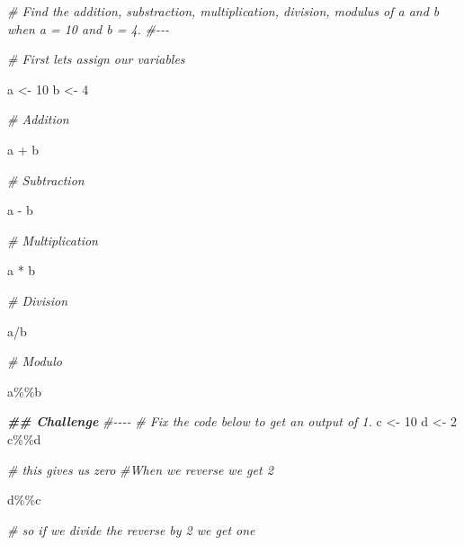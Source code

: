 \documentclass[
]{article}
\newenvironment{Shaded}{\begin{snugshade}}{\end{snugshade}}
\newcommand{\CommentTok}[1]{\textcolor[rgb]{0.56,0.35,0.01}{\textit{#1}}}
\newcommand{\DecValTok}[1]{\textcolor[rgb]{0.00,0.00,0.81}{#1}}
\newcommand{\DocumentationTok}[1]{\textcolor[rgb]{0.56,0.35,0.01}{\textbf{\textit{#1}}}}
\newcommand{\NormalTok}[1]{#1}
\newcommand{\OtherTok}[1]{\textcolor[rgb]{0.56,0.35,0.01}{#1}}
\newcommand{\SpecialCharTok}[1]{\textcolor[rgb]{0.00,0.00,0.00}{#1}}
\begin{document}
\begin{Shaded}
\begin{Highlighting}[]
\CommentTok{\# Find the addition, substraction, multiplication, division, modulus of a and b when a = 10 and b = 4.}
\CommentTok{\#{-}{-}{-}}

\CommentTok{\# First lets assign our variables}

\NormalTok{a }\OtherTok{\textless{}{-}} \DecValTok{10}
\NormalTok{b }\OtherTok{\textless{}{-}} \DecValTok{4}

\CommentTok{\# Addition}

\NormalTok{a }\SpecialCharTok{+}\NormalTok{ b}

\CommentTok{\# Subtraction}

\NormalTok{a }\SpecialCharTok{{-}}\NormalTok{ b}

\CommentTok{\# Multiplication}

\NormalTok{a }\SpecialCharTok{*}\NormalTok{ b}

\CommentTok{\# Division}

\NormalTok{a}\SpecialCharTok{/}\NormalTok{b}

\CommentTok{\# Modulo}

\NormalTok{a}\SpecialCharTok{\%\%}\NormalTok{b}
\end{Highlighting}
\end{Shaded}

\begin{Shaded}
\begin{Highlighting}[]

\DocumentationTok{\#\# Challenge}
\CommentTok{\#{-}{-}{-}{-}}
\CommentTok{\# Fix the code below to get an output of 1. }
\NormalTok{c }\OtherTok{\textless{}{-}} \DecValTok{10}
\NormalTok{d }\OtherTok{\textless{}{-}} \DecValTok{2}
\NormalTok{c}\SpecialCharTok{\%\%}\NormalTok{d}

\CommentTok{\# this gives us zero}
\CommentTok{\#When we reverse we get 2}

\NormalTok{d}\SpecialCharTok{\%\%}\NormalTok{c}

\CommentTok{\# so if we divide the reverse by 2 we get one}
\end{Highlighting}
\end{Shaded}
\end{document}
